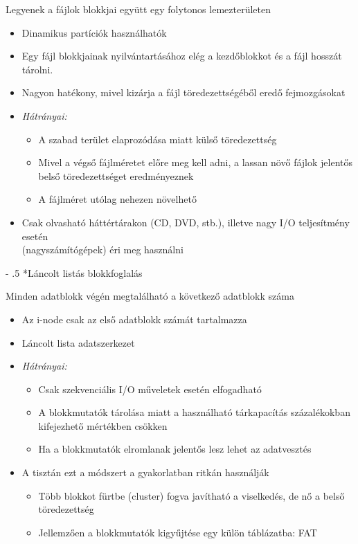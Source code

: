 \documentclass[tikz,12pt,margin=0px]{article}
\makeatletter
\renewcommand\paragraph{%
	\@startsection{paragraph}{4}{0mm}%
	{-\baselineskip}%
	{.5\baselineskip}%
	{\normalfont\normalsize\bfseries}}
\makeatother
\begin{document}
    Legyenek a fájlok blokkjai együtt egy folytonos lemezterületen
    \begin{itemize}[topsep=8pt,itemsep=4pt,partopsep=4pt, parsep=4pt]
      \item Dinamikus partíciók használhatók
      \item Egy fájl blokkjainak nyilvántartásához elég a kezdőblokkot és a fájl hosszát tárolni.
      \item Nagyon hatékony, mivel kizárja a fájl töredezettségéből eredő fejmozgásokat
      \item \emph{Hátrányai:}
      \begin{itemize}
        \item A szabad terület elaprozódása miatt külső töredezettség
        \item Mivel a végső fájlméretet előre meg kell adni, a lassan növő fájlok jelentős belső töredezettséget eredményeznek
        \item A fájlméret utólag nehezen növelhető
      \end{itemize}
      \item Csak olvasható háttértárakon (CD, DVD, stb.), illetve nagy I/O teljesítmény esetén\\ (nagyszámítógépek) éri meg használni
    \end{itemize}

    \paragraph*{Láncolt listás blokkfoglalás}

    Minden adatblokk végén megtalálható a következő adatblokk száma
    \begin{itemize}[topsep=8pt,itemsep=4pt,partopsep=4pt, parsep=4pt]
      \item Az i-node csak az első adatblokk számát tartalmazza
      \item Láncolt lista adatszerkezet
      \item \emph{Hátrányai:}
      \begin{itemize}
        \item Csak szekvenciális I/O műveletek esetén elfogadható
        \item A blokkmutatók tárolása miatt a használható tárkapacítás százalékokban kifejezhető mértékben csökken
        \item Ha a blokkmutatók elromlanak jelentős lesz lehet az adatvesztés
      \end{itemize}
      \item A tisztán ezt a módszert a gyakorlatban ritkán használják
      \begin{itemize}
        \item Több blokkot fürtbe (cluster) fogva javítható a viselkedés, de nő a belső töredezettség
        \item Jellemzően a blokkmutatók kigyűjtése egy külön táblázatba: FAT
      \end{itemize}
    \end{itemize}
\end{document}
